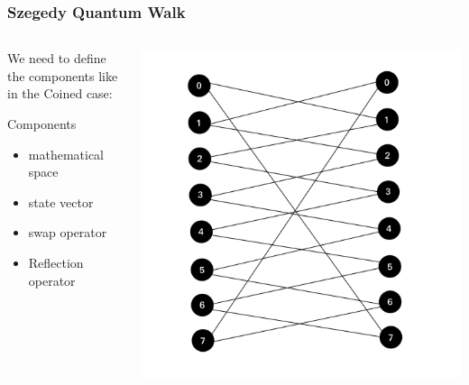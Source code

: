 \documentclass{beamer}
\begin{document}
\begin{frame}
    \frametitle{Szegedy Quantum Walk}
    \begin{columns}
        \begin{column}{.5\textwidth}
            We need to define the components like in the Coined case:
            \begin{block}{Components}
                
                \begin{itemize}
                    \item mathematical space
                    \item state vector
                    \item swap operator
                    \item Reflection operator
                \end{itemize}
            \end{block}
        \end{column}
        \begin{column}{.5\textwidth}
            \includegraphics[scale=0.25]{img/bipartite.png}
            
        \end{column}
    \end{columns}
\end{frame}
\end{document}
